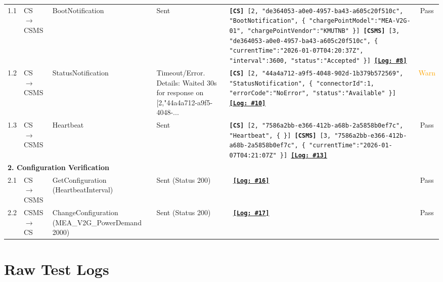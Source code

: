 \documentclass[10pt, a4paper, landscape]{article}
\begin{document}
\begin{longtable}{|p{1.0cm}|p{2.5cm}|p{4.0cm}|p{5.0cm}|p{10.0cm}|c|}
\hline
\endfoot
\multicolumn{6}{|l|}{\cellcolor{blue!10}\textbf{1. Boot Verification}} \\
\hline
1.1 & CS $\to$ CSMS & BootNotification & Sent & \footnotesize\texttt{\newline \textbf{[CS]} [2, "de364053-a0e0-4957-ba43-a605c20f510c", "BootNotification", \{ "chargePointModel":"MEA-V2G-01", "chargePointVendor":"KMUTNB" \}] \newline \textbf{[CSMS]} [3, "de364053-a0e0-4957-ba43-a605c20f510c", \{ "currentTime":"2026-01-07T04:20:37Z", "interval":3600, "status":"Accepted" \}] \newline \hyperref[lines.8]{\textbf{[Log: \#8]}}} & Pass \\
\hline
1.2 & CS $\to$ CSMS & StatusNotification & Timeout/Error. Details: Waited 30s for response on [2,"44a4a712-a9f5-4048-... & \footnotesize\texttt{\newline \textbf{[CS]} [2, "44a4a712-a9f5-4048-902d-1b379b572569", "StatusNotification", \{ "connectorId":1, "errorCode":"NoError", "status":"Available" \}] \newline \hyperref[lines.10]{\textbf{[Log: \#10]}}} & \textcolor{orange}{Warn} \\
\hline
1.3 & CS $\to$ CSMS & Heartbeat & Sent & \footnotesize\texttt{\newline \textbf{[CS]} [2, "7586a2bb-e366-412b-a68b-2a5858b0ef7c", "Heartbeat", \{  \}] \newline \textbf{[CSMS]} [3, "7586a2bb-e366-412b-a68b-2a5858b0ef7c", \{ "currentTime":"2026-01-07T04:21:07Z" \}] \newline \hyperref[lines.13]{\textbf{[Log: \#13]}}} & Pass \\
\hline
\multicolumn{6}{|l|}{\cellcolor{blue!10}\textbf{2. Configuration Verification}} \\
\hline
2.1 & CS $\to$ CSMS & GetConfiguration (HeartbeatInterval) & Sent (Status 200) & \footnotesize\texttt{ \newline \hyperref[lines.16]{\textbf{[Log: \#16]}}} & Pass \\
\hline
2.2 & CSMS $\to$ CS & ChangeConfiguration (MEA\_V2G\_PowerDemand 2000) & Sent (Status 200) & \footnotesize\texttt{ \newline \hyperref[lines.17]{\textbf{[Log: \#17]}}} & Pass \\
\hline

\end{longtable}
\newpage
\appendix
\section{Raw Test Logs}
\label{sec:raw_logs}
\normalsize

\end{document}
